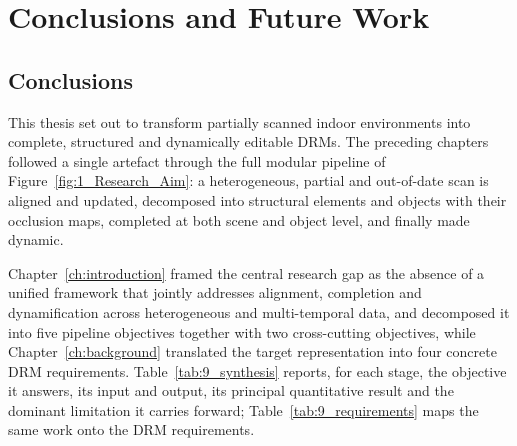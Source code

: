 \cleardoublepage
{}
\cleardoublepage

\chapter{Conclusions and Future Work}
\label{ch:conclusion}

\section{Conclusions}
\label{sec:9_conclusions}

This thesis set out to transform partially scanned indoor environments into complete, structured and dynamically editable \glspl{DRM}. The preceding chapters followed a single artefact through the full modular pipeline of Figure~\ref{fig:1_Research_Aim}: a heterogeneous, partial and out-of-date scan is aligned and updated, decomposed into structural elements and objects with their occlusion maps, completed at both scene and object level, and finally made dynamic.

Chapter~\ref{ch:introduction} framed the central research gap as the absence of a unified framework that jointly addresses alignment, completion and dynamification across heterogeneous and multi-temporal data, and decomposed it into five pipeline objectives together with two cross-cutting objectives, while Chapter~\ref{ch:background} translated the target representation into four concrete \gls{DRM} requirements. Table~\ref{tab:9_synthesis} reports, for each stage, the objective it answers, its input and output, its principal quantitative result and the dominant limitation it carries forward; Table~\ref{tab:9_requirements} maps the same work onto the \gls{DRM} requirements.

